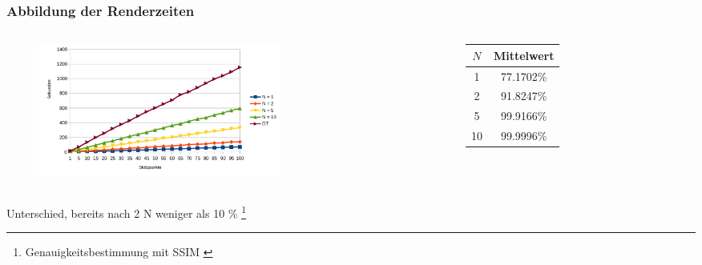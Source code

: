 \documentclass[xcolor=dvipsnames]{beamer}
\begin{document}
\begin{frame}
	\frametitle{Abbildung der Renderzeiten}
	
	\begin{columns}
		\begin{column}{8cm}
			\begin{figure}
				\includegraphics[width=8cm]{images/cool_random.pdf}
			\end{figure}
		\end{column}
		\begin{column}{5cm}
			\begin{table}[h]
				\centering
				\begin{tabular}{|c|c|}
					\hline
					$N$ & Mittelwert \\
					\hline
					1  & 77.1702\% \\
					2  & 91.8247\% \\ 
					5  & 99.9166\% \\
					10 & 99.9996\% \\
					\hline
				\end{tabular}
			\end{table}
		\end{column}
	\end{columns}
	\vspace{1cm}
	Unterschied, bereits nach 2 N weniger als 10 \% \footnote[1]{Genauigkeitsbestimmung mit SSIM \cite{Wang04imagequality}}
\end{frame}
\end{document}
